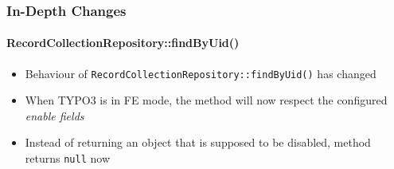 
\begin{frame}[fragile]
	\frametitle{In-Depth Changes}
	\framesubtitle{RecordCollectionRepository::findByUid()}

	\begin{itemize}
		\item Behaviour of \texttt{RecordCollectionRepository::findByUid()} has changed
		\item When TYPO3 is in FE mode, the method will now respect the configured \textit{enable fields}
		\item Instead of returning an object that is supposed to be disabled, method returns \texttt{null} now

	\end{itemize}

\end{frame}

